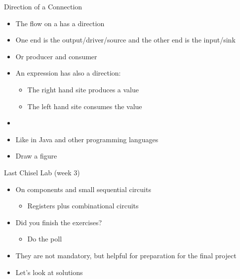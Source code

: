 \begin{frame}[fragile]{Direction of a Connection}
\begin{itemize}
\item The flow on a  has a direction
\item One end is the output/driver/source and the other end is the input/sink
\item Or producer and consumer
\item An expression has also a direction:
\begin{itemize}
\item The right hand site produces a value
\item The left hand site consumes the value
\end{itemize}
\item {}
\item Like in Java and other programming languages
\item Draw a figure
\end{itemize}
\end{frame}

\begin{frame}[fragile]{Last Chisel Lab (week 3)}
\begin{itemize}
\item On components and small sequential circuits
\begin{itemize}
\item Registers plus combinational circuits
\end{itemize}
\item Did you finish the exercises?
\begin{itemize}
\item Do the poll
\end{itemize}
\item They are not mandatory, but helpful for preparation for the final project
\item Let's look at solutions
\end{itemize}
\end{frame}

